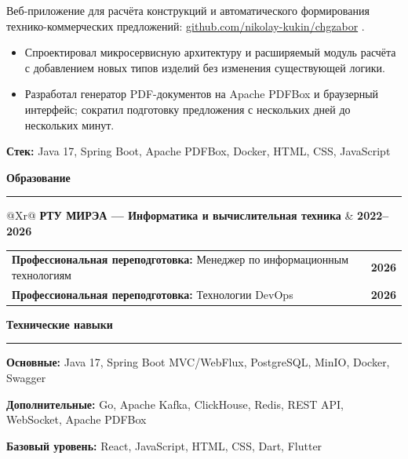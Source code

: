 \documentclass[a4paper,10pt]{article}
\newcommand{\resumeSection}[1]{%
    \par
    \vspace{6pt}%
    {\fontsize{13}{14}\selectfont
     \bfseries
     \color{accent}
     #1\par}%
    \vspace{-8pt}%
    {\color{accent}\noindent\rule{\textwidth}{0.5pt}\par}%
    \vspace{2pt}%
}
\newcommand{\resumeItem}[1]{%
    \item {\fontsize{9.5}{10.8}\selectfont #1}%
}
\newcommand{\resumeItemListStart}{%
    \begin{itemize}
}
\newcommand{\resumeItemListEnd}{%
    \end{itemize}
    \vspace{-2pt}
}
\newcommand{\tech}[1]{%
    \vspace{-0.5pt}
    {\fontsize{9.25}{10.3}\selectfont
    \textbf{Стек:} #1}%
}
\newcommand{\visibleLink}[2]{%
    \href{#1}{\textcolor{accent}{#2}}%
}
\begin{document}
{\fontsize{9.5}{10.7}\selectfont
Веб-приложение для расчёта конструкций и автоматического формирования
технико-коммерческих предложений:
\visibleLink
{https://github.com/nikolay-kukin/chgzabor}
{github.com/nikolay-kukin/chgzabor}.
}

\resumeItemListStart
    \resumeItem{
        Спроектировал микросервисную архитектуру и расширяемый модуль расчёта
        с добавлением новых типов изделий без изменения существующей логики.
    }

    \resumeItem{
        Разработал генератор PDF-документов на Apache PDFBox и браузерный
        интерфейс; сократил подготовку предложения с нескольких дней
        до нескольких минут.
    }
\resumeItemListEnd

\vspace{2pt}

\tech{
    Java 17, Spring Boot, Apache PDFBox, Docker,
    HTML, CSS, JavaScript
}

\resumeSection{Образование}

\begin{tabularx}{\textwidth}{@{}Xr@{}}
    {\fontsize{10}{11}\selectfont\bfseries
    РТУ МИРЭА — Информатика и вычислительная техника}
    &
    {\fontsize{9.5}{10.5}\selectfont\bfseries 2022–2026}
    \\[-0.5pt]

\end{tabularx}

\vspace{3pt}

\begin{tabularx}{\textwidth}{@{}Xr@{}}
    {\fontsize{9.3}{10.4}\selectfont
    \textbf{Профессиональная переподготовка:}
    Менеджер по информационным технологиям}
    &
    {\fontsize{9.3}{10.4}\selectfont\bfseries 2026}
    \\[0.5pt]

    {\fontsize{9.3}{10.4}\selectfont
    \textbf{Профессиональная переподготовка:}
    Технологии DevOps}
    &
    {\fontsize{9.3}{10.4}\selectfont\bfseries 2026}
\end{tabularx}

\resumeSection{Технические навыки}

{\fontsize{9.3}{10.5}\selectfont
\textbf{Основные:}
Java 17, Spring Boot MVC/WebFlux, PostgreSQL, MinIO, Docker, Swagger

\vspace{1.5pt}

\textbf{Дополнительные:}
Go, Apache Kafka, ClickHouse, Redis, REST API, WebSocket, Apache PDFBox

\vspace{1pt}

\textbf{Базовый уровень:}
React, JavaScript, HTML, CSS, Dart, Flutter
}
\end{document}
